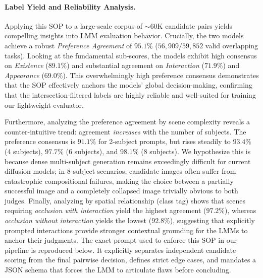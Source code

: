 \paragraph{Label Yield and Reliability Analysis.}
Applying this SOP to a large-scale corpus of $\sim$60K candidate pairs yields compelling insights into LMM evaluation behavior. Crucially, the two models achieve a robust \emph{Preference Agreement} of $95.1\%$ ($56,909 / 59,852$ valid overlapping tasks). Looking at the fundamental sub-scores, the models exhibit high consensus on \emph{Existence} ($89.1\%$) and substantial agreement on \emph{Interaction} ($71.9\%$) and \emph{Appearance} ($69.0\%$). This overwhelmingly high preference consensus demonstrates that the SOP effectively anchors the models' global decision-making, confirming that the intersection-filtered labels are highly reliable and well-suited for training our lightweight evaluator. 

Furthermore, analyzing the preference agreement by scene complexity reveals a counter-intuitive trend: agreement \emph{increases} with the number of subjects. The preference consensus is $91.1\%$ for 2-subject prompts, but rises steadily to $93.4\%$ (4 subjects), $97.7\%$ (6 subjects), and $98.1\%$ (8 subjects). We hypothesize this is because dense multi-subject generation remains exceedingly difficult for current diffusion models; in 8-subject scenarios, candidate images often suffer from catastrophic compositional failures, making the choice between a partially successful image and a completely collapsed image trivially obvious to both judges. Finally, analyzing by spatial relationship (class tag) shows that scenes requiring \emph{occlusion with interaction} yield the highest agreement ($97.2\%$), whereas \emph{occlusion without interaction} yields the lowest ($92.8\%$), suggesting that explicitly prompted interactions provide stronger contextual grounding for the LMMs to anchor their judgments.
The exact prompt used to enforce this SOP in our pipeline is reproduced below. It explicitly separates independent candidate scoring from the final pairwise decision, defines strict edge cases, and mandates a JSON schema that forces the LMM to articulate flaws before concluding.

